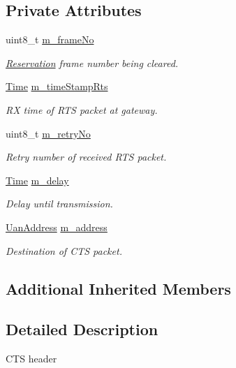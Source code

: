 \subsection*{Private Attributes}
\begin{DoxyCompactItemize}
\item 
uint8\+\_\+t \hyperlink{classns3_1_1UanHeaderRcCts_ab62bcb06362259f4357383cf2d2b3c86}{m\+\_\+frame\+No}
\begin{DoxyCompactList}\small\item\em \hyperlink{classns3_1_1Reservation}{Reservation} frame number being cleared. \end{DoxyCompactList}\item 
\hyperlink{classns3_1_1Time}{Time} \hyperlink{classns3_1_1UanHeaderRcCts_a8eaa740a99d0177683659baadcc54627}{m\+\_\+time\+Stamp\+Rts}
\begin{DoxyCompactList}\small\item\em RX time of R\+TS packet at gateway. \end{DoxyCompactList}\item 
uint8\+\_\+t \hyperlink{classns3_1_1UanHeaderRcCts_af4a8c1b06a2bc4607495a57e827e8d40}{m\+\_\+retry\+No}
\begin{DoxyCompactList}\small\item\em Retry number of received R\+TS packet. \end{DoxyCompactList}\item 
\hyperlink{classns3_1_1Time}{Time} \hyperlink{classns3_1_1UanHeaderRcCts_a82ac3cbfba4945bacbbf010e9f25b53b}{m\+\_\+delay}
\begin{DoxyCompactList}\small\item\em Delay until transmission. \end{DoxyCompactList}\item 
\hyperlink{classns3_1_1UanAddress}{Uan\+Address} \hyperlink{classns3_1_1UanHeaderRcCts_ab7432b54cf329c3c75a22381d8f831c0}{m\+\_\+address}
\begin{DoxyCompactList}\small\item\em Destination of C\+TS packet. \end{DoxyCompactList}\end{DoxyCompactItemize}
\subsection*{Additional Inherited Members}


\subsection{Detailed Description}
C\+TS header

